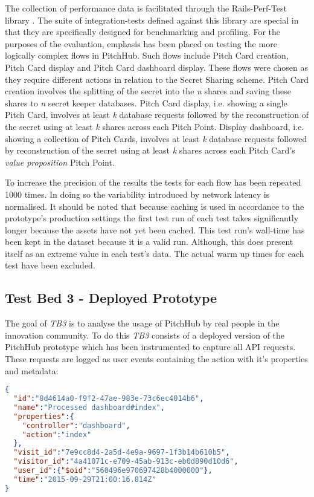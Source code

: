 The collection of performance data is facilitated through the Rails-Perf-Test library \cite{railsperftest:online}. The suite of integration-tests defined against this library are special in that they are specifically designed for benchmarking and profiling. For the purposes of the evaluation, emphasis has been placed on testing the more logically complex flows in PitchHub. Such flows include Pitch Card creation, Pitch Card display and Pitch Card dashboard display. These flows were chosen as they require different actions in relation to the Secret Sharing scheme. Pitch Card creation involves the splitting of the secret into the \textit{n} shares and saving these shares to \textit{n} secret keeper databases. Pitch Card display, i.e. showing a single Pitch Card, involves at least \textit{k} database requests followed by the reconstruction of the secret using at least \textit{k} shares across each Pitch Point. Display dashboard, i.e. showing a collection of Pitch Cards, involves at least \textit{k} database requests followed by reconstruction of the secret using at least \textit{k} shares across each Pitch Card's \textit{value proposition} Pitch Point.

To increase the precision of the results the tests for each flow has been repeated 1000 times. In doing so the variability introduced by network latency is normalised. It should be noted that because caching is used in accordance to the prototype's production settings the first test run of each test takes significantly longer because the assets have not yet been cached. This test run's wall-time has been kept in the dataset because it is a valid run. Although, this does present itself as an extreme value in each test's data. The actual warm up times for each test have been excluded.

\subsection{Test Bed 3 - Deployed Prototype}\label{SS:deployedPrototype}
The goal of \textit{TB3} is to analyse the usage of PitchHub by real people in the innovation community. To do this \textit{TB3} consists of a deployed version of the PitchHub prototype which has been instrumented to capture all API requests. These requests are logged as user events containing the action with it's properties and metadata: 

\begin{lstlisting}[language=json,firstnumber=1]
{
  "id":"8d4614a0-f9f2-47ae-983e-73c6ec4014b6",
  "name":"Processed dashboard#index",
  "properties":{
    "controller":"dashboard",
    "action":"index"
  },
  "visit_id":"7e9cc8d4-2a5d-4e9a-9697-1f3b14b610b5",
  "visitor_id":"4a41071c-e709-45ab-913c-eb0d890d10d6",
  "user_id":{"$oid":"560496e970697428b4000000"},
  "time":"2015-09-29T21:00:16.814Z"
}
\end{lstlisting}

